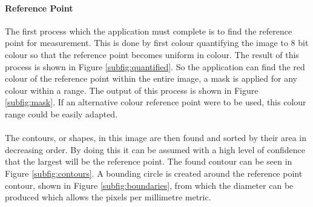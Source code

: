 			\paragraph{Reference Point}
				The first process which the application must complete is to find the reference point for measurement. This is done by first colour quantifying the image to 8 bit colour so that the reference point becomes uniform in colour. The result of this process is shown in Figure \ref{subfig:quantified}. So the application can find the red colour of the reference point within the entire image, a mask is applied for any colour within a range. The output of this process is shown in Figure \ref{subfig:mask}. If an alternative colour reference point were to be used, this colour range could be easily adapted.
				\\\\
				The contours, or shapes, in this image are then found and sorted by their area in decreasing order. By doing this it can be assumed with a high level of confidence that the largest will be the reference point. The found contour can be seen in Figure \ref{subfig:contours}. A bounding circle is created around the reference point contour, shown in Figure \ref{subfig:boundaries}, from which the diameter can be produced which allows the pixels per millimetre metric.
